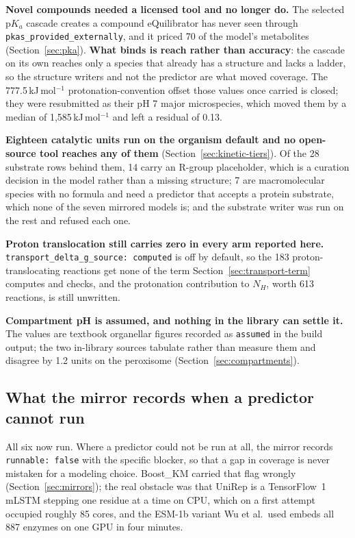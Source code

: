 \textbf{Novel compounds needed a licensed tool and no longer do.} The selected p$K_a$
cascade creates a compound eQuilibrator has never seen through
\texttt{pkas\_provided\_externally}, and it priced 70 of the model's metabolites
(Section~\ref{sec:pka}). \textbf{What binds is reach rather than accuracy}: the cascade on
its own reaches only a species that already has a structure and lacks a ladder, so the
structure writers and not the predictor are what moved coverage. The
777.5\,kJ\,mol$^{-1}$ protonation-convention offset those values once carried is closed;
they were resubmitted as their pH 7 major microspecies, which moved them by a median of
1{,}585\,kJ\,mol$^{-1}$ and left a residual of 0.13.

\textbf{Eighteen catalytic units run on the organism default and no open-source tool reaches
any of them} (Section~\ref{sec:kinetic-tiers}). Of the 28 substrate rows behind them, 14
carry an R-group placeholder, which is a curation decision in the model rather than a
missing structure; 7 are macromolecular species with no formula and need a predictor that
accepts a protein substrate, which none of the seven mirrored models is; and the substrate
writer was run on the rest and refused each one.

\textbf{Proton translocation still carries zero in every arm reported here.}
\texttt{transport\_delta\_g\_source: computed} is off by default, so the 183
proton-translocating reactions get none of the term Section~\ref{sec:transport-term}
computes and checks, and the protonation contribution to $N_H$, worth 613 reactions, is
still unwritten.

\textbf{Compartment pH is assumed, and nothing in the library can settle it.} The values are
textbook organellar figures recorded as \texttt{assumed} in the build output; the two
in-library sources tabulate rather than measure them and disagree by 1.2 units on the
peroxisome (Section~\ref{sec:compartments}).

\subsection{What the mirror records when a predictor cannot run}

All six now run. Where a predictor could not be run at all, the mirror records
\texttt{runnable: false} with the specific blocker, so that a gap in coverage is never
mistaken for a modeling choice. Boost\_KM carried that flag wrongly
(Section~\ref{sec:mirrors}); the real obstacle was that UniRep is a TensorFlow~1 mLSTM stepping one residue at a time on CPU, which on a first attempt
occupied roughly 85 cores, and the ESM-1b variant Wu et al.\ used embeds all 887 enzymes on
one GPU in four minutes.

